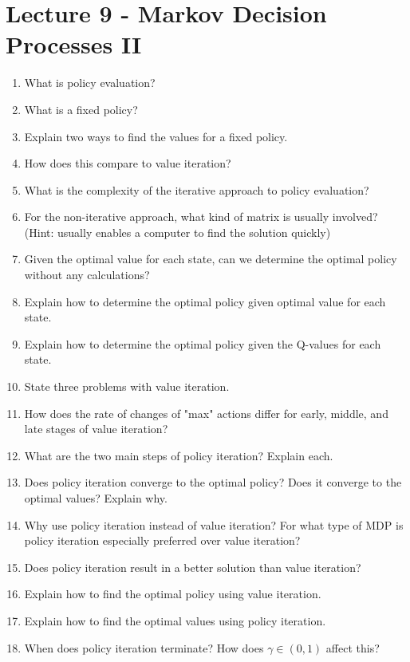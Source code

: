 \documentclass[]{article}
\begin{document}
\section*{Lecture 9 - Markov Decision Processes II}
\begin{enumerate}[resume*]
\item What is policy evaluation?
\item What is a fixed policy?
\item Explain two ways to find the values for a fixed policy.
\item How does this compare to value iteration?
\item What is the complexity of the iterative approach to policy evaluation?
\item For the non-iterative approach, what kind of matrix is usually involved? (Hint: usually enables a computer to find the solution quickly) \\

\item Given the optimal value for each state, can we determine the optimal policy without any calculations?
\item Explain how to determine the optimal policy given optimal value for each state.
\item Explain how to determine the optimal policy given the Q-values for each state. \\

\item State three problems with value iteration.
\item How does the rate of changes of "max" actions differ for early, middle, and late stages of value iteration?

\item What are the two main steps of policy iteration? Explain each.
\item Does policy iteration converge to the optimal policy? Does it converge to the optimal values? Explain why.
\item Why use policy iteration instead of value iteration? For what type of MDP is policy iteration especially preferred over value iteration?
\item Does policy iteration result in a better solution than value iteration?
\item Explain how to find the optimal policy using value iteration.
\item Explain how to find the optimal values using policy iteration.
\item When does policy iteration terminate? How does $\gamma \in (0,1)$ affect this?


\end{enumerate}
\end{document}
